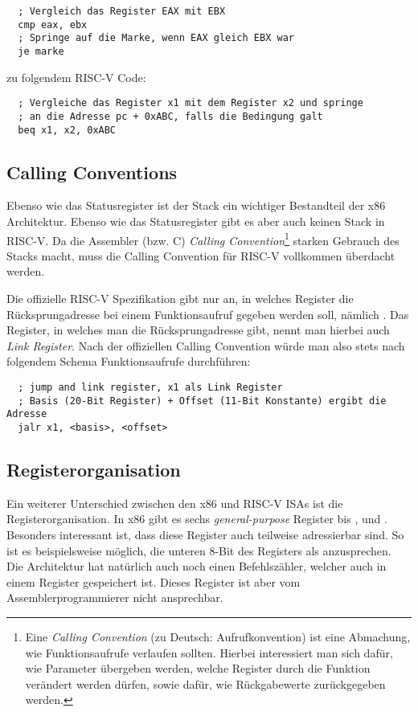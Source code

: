 \begin{lstlisting}
  ; Vergleich das Register EAX mit EBX
  cmp eax, ebx
  ; Springe auf die Marke, wenn EAX gleich EBX war
  je marke
\end{lstlisting}

zu folgendem RISC-V Code:

\begin{lstlisting}
  ; Vergleiche das Register x1 mit dem Register x2 und springe
  ; an die Adresse pc + 0xABC, falls die Bedingung galt
  beq x1, x2, 0xABC
\end{lstlisting}

\subsection{Calling Conventions}

Ebenso wie das Statusregister ist der Stack ein wichtiger Bestandteil der x86
Architektur. Ebenso wie das Statusregister gibt es aber auch keinen Stack in
RISC-V. Da die Assembler (bzw. C) \emph{Calling Convention}\footnote{Eine
  \emph{Calling Convention} (zu Deutsch: Aufrufkonvention) ist eine Abmachung, wie Funktionsaufrufe verlaufen
  sollten. Hierbei interessiert man sich dafür, wie Parameter übergeben werden,
  welche Register durch die Funktion verändert werden dürfen, sowie dafür, wie
  Rückgabewerte zurückgegeben werden.} starken Gebrauch des Stacks macht, muss
die Calling Convention für RISC-V vollkommen überdacht werden.

Die offizielle RISC-V Spezifikation gibt nur an, in welches Register die
Rücksprungadresse bei einem Funktionsaufruf gegeben werden soll, nämlich
. Das Register, in welches man die Rücksprungadresse gibt, nennt man
hierbei auch \emph{Link Register}. Nach der offiziellen Calling Convention würde
man also stets nach folgendem Schema Funktionsaufrufe durchführen:

\begin{lstlisting}
  ; jump and link register, x1 als Link Register
  ; Basis (20-Bit Register) + Offset (11-Bit Konstante) ergibt die Adresse
  jalr x1, <basis>, <offset>
\end{lstlisting}

\subsection{Registerorganisation}

Ein weiterer Unterschied zwischen den x86 und RISC-V ISAs ist die
Registerorganisation. In x86 gibt es sechs \emph{general-purpose} Register
 bis ,  und . Besonders interessant ist,
dass diese Register auch teilweise adressierbar sind. So ist es beispielsweise
möglich, die unteren 8-Bit des Registers  als 
anzusprechen. Die Architektur hat natürlich auch noch einen Befehlszähler,
welcher auch in einem Register gespeichert ist. Dieses Register ist aber vom
Assemblerprogrammierer nicht ansprechbar.

